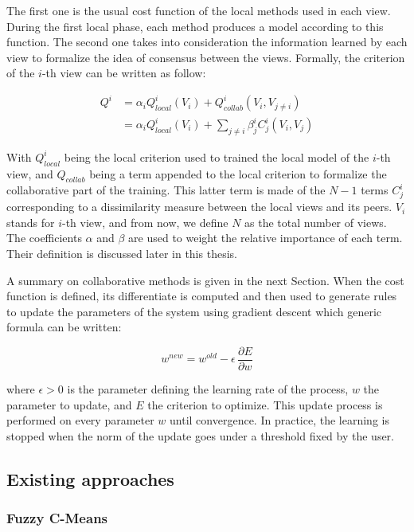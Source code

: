     The first one is the usual cost function of the local methods used in each view. During the first local phase, each method produces a model according to this function. The second one takes into consideration the information learned by each view to formalize the idea of consensus between the views. Formally, the criterion of the $i$-th view can be written as follow:

    \begin{align}
        \label{eq:globalC}
        Q^i &= \alpha_i Q^i_{local}(V_i) + Q^i_{collab}(V_i, V_{j\neq i})\\
        &= \alpha_i Q^i_{local}(V_i) + \sum_{j\neq i} \beta^i_j C_j^i(V_i, V_j)
    \end{align}

    With $Q^i_{local}$ being the local criterion used to trained the local model of the $i$-th view, and $Q_{collab}$ being a term appended to the local criterion to formalize the collaborative part of the training. This latter term is made of the $N-1$ terms $C_j^i$ corresponding to a dissimilarity measure between the local views and its peers. $V_i$ stands for $i$-th view, and from now, we define $N$ as the total number of views. The coefficients $\alpha$ and $\beta$ are used to weight the relative importance of each term. Their definition is discussed later in this thesis.
    
    A summary on collaborative methods is given in the next Section. When the cost function is defined, its differentiate is computed and then used to generate rules to update the parameters of the system using gradient descent which generic formula can be written: 
    
		\begin{equation}
            {w}^{new} = {w}^{old} - \epsilon \, \frac{\partial E}{\partial w}
		\end{equation}
		
        where $\epsilon > 0$ is the parameter defining the learning rate of the process, $w$ the parameter to update, and $E$ the criterion to optimize. This update process is performed on every parameter $w$ until convergence. In practice, the learning is stopped when the norm of the update goes under a threshold fixed by the user. 
    
    \subsection{Existing approaches}

    \subsubsection{Fuzzy C-Means}

